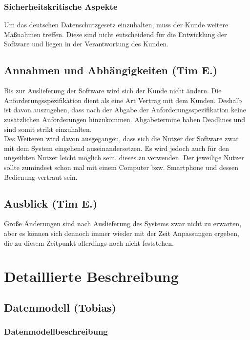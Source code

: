 \documentclass[fontsize=12pt,paper=a4,twoside]{scrartcl}
\begin{document}
\subsubsection{Sicherheitskritische Aspekte} \label{subsubsec:SicherheitsAspekte} Um das deutschen Datenschutzgesetz einzuhalten, muss der Kunde weitere Maßnahmen treffen. Diese sind nicht entscheidend für die Entwicklung der Software und liegen in der Verantwortung des Kunden.

\subsection{Annahmen und Abhängigkeiten (Tim E.)} \label{subsec:Annahmen} Bis zur Auslieferung der Software wird sich der Kunde nicht ändern. Die Anforderungsspezifikation dient als eine Art Vertrag mit dem Kunden. Deshalb ist davon auszugehen, dass nach der Abgabe der Anforderungsspezifikation keine zusätzlichen Anforderungen hinzukommen. Abgabetermine haben Deadlines und sind somit strikt einzuhalten.\\
Des Weiteren wird davon ausgegangen, dass sich die Nutzer der Software zwar mit dem System eingehend auseinandersetzen. Es wird jedoch auch für den ungeübten Nutzer leicht möglich sein, dieses zu verwenden. Der jeweilige Nutzer sollte zumindest schon mal mit einem Computer bzw. Smartphone und dessen Bedienung vertraut sein.\\


\subsection{Ausblick (Tim E.)} \label{subsec:Ausblick} Große Änderungen sind nach Auslieferung des Systems zwar nicht zu erwarten, aber es können sich dennoch immer wieder mit der Zeit Anpassungen ergeben, die zu diesem Zeitpunkt allerdings noch nicht feststehen.

\section{Detaillierte Beschreibung}
\label{ch:DetaillierteBeschreibung}


\subsection{Datenmodell (Tobias)}

\subsubsection{Datenmodellbeschreibung}
\end{document}
